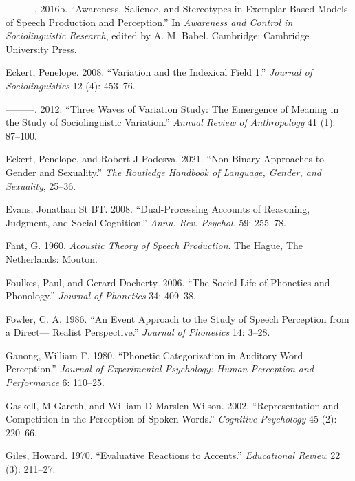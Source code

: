\documentclass[
  letterpaper,
  DIV=11,
  numbers=noendperiod]{scrartcl}
\newlength{\cslhangindent}
\newenvironment{CSLReferences}[2] %
 {\begin{list}{}{%
  \setlength{\itemindent}{0pt}
  \setlength{\leftmargin}{0pt}
  \setlength{\parsep}{0pt}
  \ifodd #1
   \setlength{\leftmargin}{\cslhangindent}
   \setlength{\itemindent}{-1\cslhangindent}
  \fi
  \setlength{\itemsep}{#2\baselineskip}}}
 {\end{list}}
\begin{document}
\begin{CSLReferences}{1}{0}
---------. 2016b. {``Awareness, Salience, and Stereotypes in
Exemplar-Based Models of Speech Production and Perception.''} In
\emph{Awareness and Control in Sociolinguistic Research}, edited by A.
M. Babel. Cambridge: Cambridge University Press.

Eckert, Penelope. 2008. {``Variation and the Indexical Field 1.''}
\emph{Journal of Sociolinguistics} 12 (4): 453--76.

---------. 2012. {``Three Waves of Variation Study: {The} Emergence of
Meaning in the Study of Sociolinguistic Variation.''} \emph{Annual
Review of Anthropology} 41 (1): 87--100.

Eckert, Penelope, and Robert J Podesva. 2021. {``Non-Binary Approaches
to Gender and Sexuality.''} \emph{The Routledge Handbook of Language,
Gender, and Sexuality}, 25--36.

Evans, Jonathan St BT. 2008. {``Dual-Processing Accounts of Reasoning,
Judgment, and Social Cognition.''} \emph{Annu. Rev. Psychol.} 59:
255--78.

Fant, G. 1960. \emph{Acoustic Theory of Speech Production}. The Hague,
The Netherlands: Mouton.

Foulkes, Paul, and Gerard Docherty. 2006. {``The Social Life of
Phonetics and Phonology.''} \emph{Journal of Phonetics} 34: 409--38.

Fowler, C. A. 1986. {``An Event Approach to the Study of Speech
Perception from a Direct--- Realist Perspective.''} \emph{Journal of
Phonetics} 14: 3--28.

Ganong, William F. 1980. {``Phonetic Categorization in Auditory Word
Perception.''} \emph{Journal of Experimental Psychology: Human
Perception and Performance} 6: 110--25.

Gaskell, M Gareth, and William D Marslen-Wilson. 2002. {``Representation
and Competition in the Perception of Spoken Words.''} \emph{Cognitive
Psychology} 45 (2): 220--66.

Giles, Howard. 1970. {``Evaluative Reactions to Accents.''}
\emph{Educational Review} 22 (3): 211--27.


\end{CSLReferences}
\end{document}
